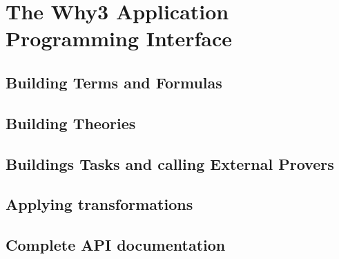 \chapter{The Why3 Application Programming Interface}

\section{Building Terms and Formulas}

\section{Building Theories}

\section{Buildings Tasks and calling External Provers}

\section{Applying transformations}

\section{Complete API documentation}



